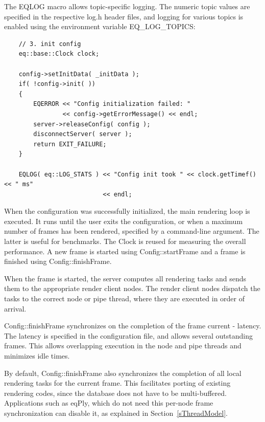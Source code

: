\documentclass[10pt,a4]{scrartcl}
\newcommand{\sref}[1]{Section~\ref{#1}}
\begin{document}
The \textsf{EQLOG} macro allows topic-specific logging. The numeric
topic values are specified in the respective \textsf{log.h} header
files, and logging for various topics is enabled using the environment
variable \textsf{EQ\_LOG\_TOPICS}:

{\footnotesize\begin{lstlisting}
    // 3. init config
    eq::base::Clock clock;

    config->setInitData( _initData );
    if( !config->init( ))
    {
        EQERROR << "Config initialization failed: " 
                << config->getErrorMessage() << endl;
        server->releaseConfig( config );
        disconnectServer( server );
        return EXIT_FAILURE;
    }

    EQLOG( eq::LOG_STATS ) << "Config init took " << clock.getTimef() << " ms"
                           << endl;
\end{lstlisting}}%

When the configuration was successfully initialized, the main rendering
loop is executed. It runs until the user exits the
configuration, or when a maximum number of frames has been rendered,
specified by a command-line argument. The latter is useful for
benchmarks. The \textsf{Clock} is reused for measuring the overall
performance. A new frame is started using \textsf{Config::startFrame}
and a frame is finished using \textsf{Config::finishFrame}.

When the frame is started, the server computes all rendering tasks and
sends them to the appropriate render client nodes. The render client
nodes dispatch the tasks to the correct node or pipe thread, where they
are executed in order of arrival.

\textsf{Config::finishFrame} synchronizes on the completion of the frame
\textsf{current - latency}. The latency is specified in the
configuration file, and allows several outstanding frames. This allows
overlapping execution in the node and pipe threads and minimizes idle
times. 

By default, \textsf{Config::finish\-Fra\-me} also synchronizes the
completion of all local rendering tasks for the current frame. This
facilitates porting of existing rendering codes, since the database does
not have to be multi-buffered. Applications such as \textsf{eqPly}, which
do not need this per-node frame synchronization can disable it, as
explained in \sref{sThreadModel}.
\end{document}
